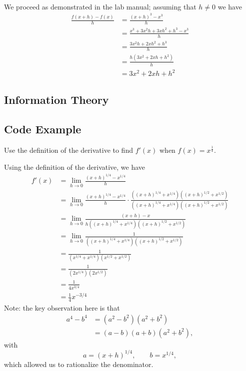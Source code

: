 \documentclass{article}
\begin{document}
\paragraph{}
We proceed as demonstrated in the lab manual; assuming that $h\ne 0$ 
we have
\begin{align*}
    \frac{f(x+h)-f(x)}{h} & =  \frac{(x+h)^3-x^3}{h}   \\
                          & =  \frac{x^3+3x^2h+3xh^2+h^3 - x^3}{h}\\
                          & =  \frac{3x^2h+2xh^2+h^3}{h}\\
                          & =  \frac{h(3x^2+2xh+h^2)}{h}\\
                          & =  3x^2+2xh+h^2
\end{align*} 

\subsection*{Information Theory}



\subsection{Code Example}


Use the definition of the derivative to find $f'(x)$ when $f(x)=x^{\frac{1}{4}}$.

Using the definition of the derivative, we have
\begin{align*}
            f'(x)           &= \lim_{h\rightarrow 0}\frac{(x+h)^{1/4}-x^{1/4}}{h}   \\
                            &=  \lim_{h\rightarrow 0}\frac{(x+h)^{1/4}-x^{1/4}}{h}\cdot \frac{((x+h)^{1/4}+x^{1/4})((x+h)^{1/2}+x^{1/2})}{((x+h)^{1/4}+x^{1/4})((x+h)^{1/2}+x^{1/2})}\\
                            &=  \lim_{h\rightarrow 0}\frac{(x+h)-x}{h((x+h)^{1/4}+x^{1/4})((x+h)^{1/2}+x^{1/2})}    \\  
                            &=  \lim_{h\rightarrow 0}\frac{1}{((x+h)^{1/4}+x^{1/4})((x+h)^{1/2}+x^{1/2})}   \\
                            &= \frac{1}{(x^{1/4}+x^{1/4})(x^{1/2}+x^{1/2})} \\
                            &=  \frac{1}{(2x^{1/4})(2x^{1/2})}  \\
                            &=  \frac{1}{4x^{3/4}}  \\
                            &=  \frac{1}{4}x^{-3/4}
\end{align*}
Note: the key observation here is that
\begin{align*}
    a^4-b^4 &= (a^2-b^2)(a^2+b^2)   \\
        &= (a-b)(a+b)(a^2+b^2), 
\end{align*}
with 
\[
    a = (x+h)^{1/4}, \qquad b = x^{1/4},
\]
which allowed us to rationalize the denominator.
\end{document}
